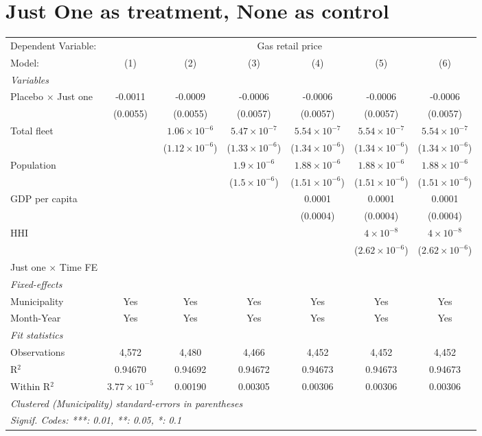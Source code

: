 \documentclass[
]{article}
\begin{document}
\hypertarget{just-one-as-treatment-none-as-control}{%
\section{Just One as treatment, None as
control}\label{just-one-as-treatment-none-as-control}}

\begin{tabular}{lcccccc}
\tabularnewline\midrule\midrule
Dependent Variable:&\multicolumn{6}{c}{Gas retail price}\\
Model:&(1) & (2) & (3) & (4) & (5) & (6)\\
\midrule \emph{Variables}&   &   &   &   &   &  \\
Placebo $\times $ Just one & -0.0011 & -0.0009 & -0.0006 & -0.0006 & -0.0006 & -0.0006\\
  &(0.0055) & (0.0055) & (0.0057) & (0.0057) & (0.0057) & (0.0057)\\
Total fleet &    & $1.06\times 10^{-6}$ & $5.47\times 10^{-7}$ & $5.54\times 10^{-7}$ & $5.54\times 10^{-7}$ & $5.54\times 10^{-7}$\\
  &   & ($1.12\times 10^{-6}$) & ($1.33\times 10^{-6}$) & ($1.34\times 10^{-6}$) & ($1.34\times 10^{-6}$) & ($1.34\times 10^{-6}$)\\
Population &    &    & $1.9\times 10^{-6}$ & $1.88\times 10^{-6}$ & $1.88\times 10^{-6}$ & $1.88\times 10^{-6}$\\
  &   &    & ($1.5\times 10^{-6}$) & ($1.51\times 10^{-6}$) & ($1.51\times 10^{-6}$) & ($1.51\times 10^{-6}$)\\
GDP per capita &    &    &    & 0.0001 & 0.0001 & 0.0001\\
  &   &    &    & (0.0004) & (0.0004) & (0.0004)\\
HHI &    &    &    &    & $4\times 10^{-8}$ & $4\times 10^{-8}$\\
  &   &    &    &    & ($2.62\times 10^{-6}$) & ($2.62\times 10^{-6}$)\\
Just one $\times$ Time FE &  &  &  &  &  & \\
\midrule \emph{Fixed-effects}&   &   &   &   &   &  \\
Municipality & Yes & Yes & Yes & Yes & Yes & Yes\\
Month-Year & Yes & Yes & Yes & Yes & Yes & Yes\\
\midrule \emph{Fit statistics}&  & & & & & \\
Observations & 4,572&4,480&4,466&4,452&4,452&4,452\\
R$^2$ & 0.94670&0.94692&0.94672&0.94673&0.94673&0.94673\\
Within R$^2$ & $3.77\times 10^{-5}$&0.00190&0.00305&0.00306&0.00306&0.00306\\
\midrule\midrule\multicolumn{7}{l}{\emph{Clustered (Municipality) standard-errors in parentheses}}\\
\multicolumn{7}{l}{\emph{Signif. Codes: ***: 0.01, **: 0.05, *: 0.1}}\\
\end{tabular}
\end{document}

